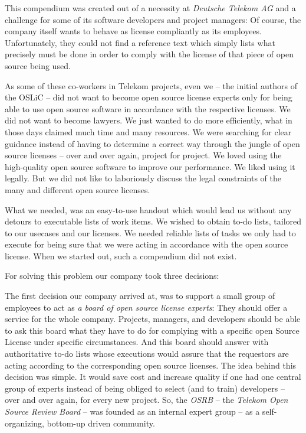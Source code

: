 This compendium was created out of a necessity at \emph{Deutsche Telekom AG} and
a challenge for some of its software developers and project managers: Of course,
the company itself wants to behave as license compliantly as its employees.
Unfortunately, they could not find a reference text which simply lists what
precisely must be done in order to comply with the license of that piece of open
source being used.

As some of these co-workers in Telekom projects, even we -- the initial authors
of the OSLiC -- did not want to become open source license experts only for being
able to use open source software in accordance with the respective licenses. We
did not want to become lawyers. We just wanted to do more efficiently, what
in those days claimed much time and many resources. We were searching for clear
guidance instead of having to determine a correct way through the jungle of open
source licenses -- over and over again, project for project. We loved using the
high-quality open source software to improve our performance. We liked using it
legally. But we did not like to laboriously discuss the legal constraints of the
many and different open source licenses.

What we needed, was an easy-to-use handout which would lead us without any
detours to executable lists of work items. We wished to obtain to-do lists,
tailored to our usecases and our licenses. We needed reliable lists of tasks we
only had to execute for being sure that we were acting in accordance with the
open source license. When we started out, such a compendium did not exist.

For solving this problem our company took three decisions:

The first decision our company arrived at, was to support a small group of
employees to act as \emph{a board of open source license experts}: They should
offer a service for the whole company. Projects, managers, and developers should
be able to ask this board what they have to do for complying with a specific
open Source License under specific circumstances. And this board should answer
with authoritative to-do lists whose executions would assure that the requestors
are acting according to the corresponding open source licenses. The idea behind
this decision was simple. It would save cost and increase quality if one had one
central group of experts instead of being obliged to select (and to train)
developers -- over and over again, for every new project. So, the \emph{OSRB} --
the \emph{Telekom Open Source Review Board} -- was founded as an internal expert
group -- as a self-organizing, bottom-up driven community.

